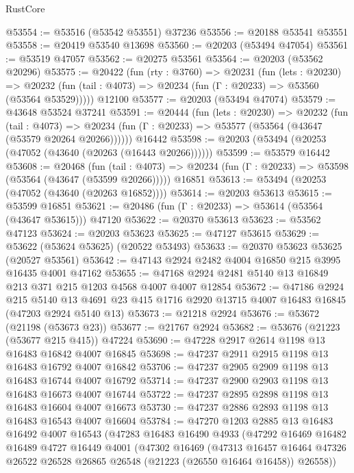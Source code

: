 \begin{lexlean}{RustCore}
\begin{coremodule}
@53554 := @53516 (@53542 @53551) @37236
@53556 := @20188 @53541 @53551
@53558 := @20419 @53540 @13698
@53560 := @20203 (@53494 @47054)
@53561 := @53519 @47057
@53562 := @20275 @53561
@53564 := @20203 (@53562 @20296)
@53575 := @20422
    (fun (rty : @3760) =>
    @20231
      (fun (lets : @20230) =>
      @20232 (fun (tail : @4073) => @20234 (fun (Γ : @20233) => @53560 (@53564 @53529)))))
    @12100
@53577 := @20203 (@53494 @47074)
@53579 := @43648 @53524 @37241
@53591 := @20444
    (fun (lets : @20230) =>
    @20232
      (fun (tail : @4073) =>
      @20234 (fun (Γ : @20233) => @53577 (@53564 (@43647 (@53579 @20264 @20266))))))
    @16442
@53598 := @20203 (@53494 (@20253 (@47052 (@43640 (@20263 (@16443 @20266))))))
@53599 := @53579 @16442
@53608 := @20468
    (fun (tail : @4073) => @20234 (fun (Γ : @20233) => @53598 (@53564 (@43647 (@53599 @20266)))))
    @16851
@53613 := @53494 (@20253 (@47052 (@43640 (@20263 @16852))))
@53614 := @20203 @53613
@53615 := @53599 @16851
@53621 := @20486 (fun (Γ : @20233) => @53614 (@53564 (@43647 @53615))) @47120
@53622 := @20370 @53613
@53623 := @53562 @47123
@53624 := @20203 @53623
@53625 := @47127 @53615
@53629 := @53622 (@53624 @53625) (@20522 @53493)
@53633 := @20370 @53623 @53625 (@20527 @53561)
@53642 := @47143 @2924 @2482 @4004 @16850 @215 @3995 @16435 @4001 @47162
@53655 := @47168 @2924 @2481 @5140 @13 @16849 @213 @371 @215 @1203 @4568 @4007 @4007 @12854
@53672 := @47186
    @2924
    @215
    @5140
    @13
    @4691
    @23
    @415
    @1716
    @2920
    @13715
    @4007
    @16483
    @16845
    (@47203 @2924 @5140 @13)
@53673 := @21218 @2924
@53676 := @53672 (@21198 (@53673 @23))
@53677 := @21767 @2924
@53682 := @53676 (@21223 (@53677 @215 @415)) @47224
@53690 := @47228 @2917 @2614 @1198 @13 @16483 @16842 @4007 @16845
@53698 := @47237 @2911 @2915 @1198 @13 @16483 @16792 @4007 @16842
@53706 := @47237 @2905 @2909 @1198 @13 @16483 @16744 @4007 @16792
@53714 := @47237 @2900 @2903 @1198 @13 @16483 @16673 @4007 @16744
@53722 := @47237 @2895 @2898 @1198 @13 @16483 @16604 @4007 @16673
@53730 := @47237 @2886 @2893 @1198 @13 @16483 @16543 @4007 @16604
@53784 := @47270
    @1203
    @2885
    @13
    @16483
    @16492
    @4007
    @16543
    (@47283
      @16483
      @16490
      @4933
      (@47292
        @16469
        @16482
        @16489
        @4727
        @16449
        @4001
        (@47302
          @16469
          (@47313
            @16457
            @16464
            @47326
            @26522
            @26528
            @26865
            @26548
            (@21223 (@26550 @16464 @16458))
            @26558))

\end{coremodule}
\end{lexlean}
